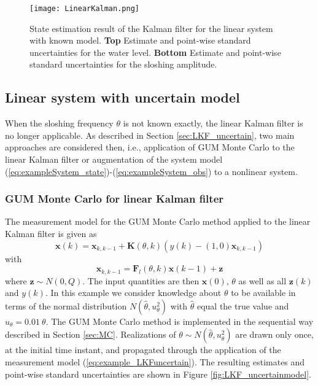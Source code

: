 \documentclass[10pt]{article}
\begin{document}
\begin{spacing}{1}
\begin{figure}[h!]
	\centering
	\texttt{[image: LinearKalman.png]}
	\caption{State estimation result of the Kalman filter for the linear system with known model. \textbf{Top} Estimate and point-wise standard uncertainties for the water level. \textbf{Bottom} Estimate and point-wise standard uncertainties for the sloshing amplitude.}
\label{fig:LKF_knownmodel}
\end{figure}

\subsection{Linear system with uncertain model}
When the sloshing frequency $\theta$ is not known exactly, the linear Kalman filter is no longer applicable. As described in Section \ref{sec:LKF_uncertain}, two main approaches are considered then, i.e., application of GUM Monte Carlo to the linear Kalman filter or augmentation of the system model (\ref{eq:exampleSystem_state})-(\ref{eq:exampleSystem_obs}) to a nonlinear system.
\subsubsection*{GUM Monte Carlo for linear Kalman filter}
The measurement model for the GUM Monte Carlo method applied to the linear Kalman filter is given as
\begin{equation}
	\bm{x}(k) = \bm{x}_{k,k-1} + \bm{K}(\theta, k)\left( y(k) - \left( 1,0 \right)\bm{x}_{k,k-1} \right)
\label{eq:example_LKFuncertain}
\end{equation}
with 
\[\bm{x}_{k,k-1} = \bm{F}_l(\theta,k)\bm{x}(k-1) + \bm{z}\]
where $\bm{z} \sim N(0,Q)$. The input quantities are then $\bm{x}(0)$, $\theta$ as well as all $\bm{z}(k)$ and $y(k)$. In this example we consider knowledge about $\theta$ to be available in terms of the normal distribution $N(\hat{\theta}, u^2_\theta)$ with $\hat{\theta}$ equal the true value and $u_\theta=0.01~\theta$. The GUM Monte Carlo method is implemented in the sequential way described in Section \ref{sec:MC}. Realizations of $\theta\sim N(\hat{\theta},u^2_{\theta})$ are drawn only once, at the initial time instant, and propagated through the application of the measurement model (\ref{eq:example_LKFuncertain}). The resulting estimates and point-wise standard uncertainties are shown in Figure \ref{fig:LKF_uncertainmodel}.


\end{spacing}
\end{document}
